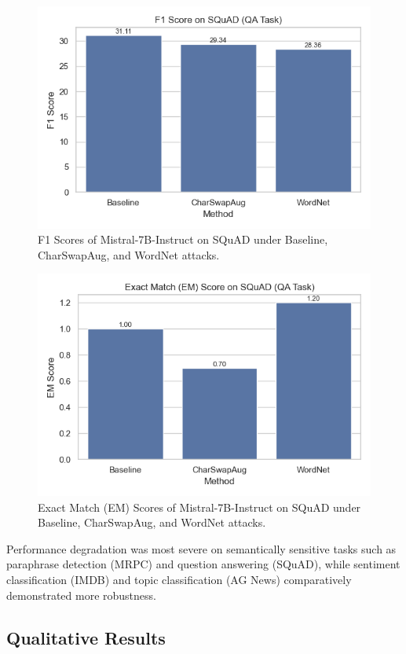 \documentclass[conference]{IEEEtran}
\begin{document}
\begin{figure}[htbp]
    \centering
    \includegraphics[width=0.65\linewidth]{figures/f1_chart_updated.png}
    \caption{F1 Scores of Mistral-7B-Instruct on SQuAD under Baseline, CharSwapAug, and WordNet attacks.}
    \label{fig:f1}
\end{figure}

\begin{figure}[htbp]
    \centering
    \includegraphics[width=0.65\linewidth]{figures/em_chart_updated.png}
    \caption{Exact Match (EM) Scores of Mistral-7B-Instruct on SQuAD under Baseline, CharSwapAug, and WordNet attacks.}
    \label{fig:em}
\end{figure}

Performance degradation was most severe on semantically sensitive tasks such as paraphrase detection (MRPC) and question answering (SQuAD), while sentiment classification (IMDB) and topic classification (AG News) comparatively demonstrated more robustness.

\subsection{Qualitative Results}
\end{document}
